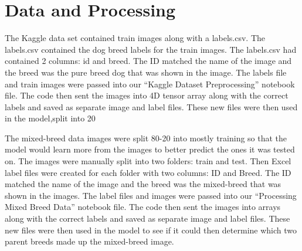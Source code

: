 \documentclass[12pt]{report}
\begin{document}
\section* {Data and Processing} 
		
\indent	\par  
\par The Kaggle data set contained train images along with a labels.csv. The labels.csv contained the dog breed labels for the train images. The labels.csv had contained 2 columns: id and breed. The ID matched the name of the image and the breed was the pure breed dog that was shown in the image. The labels file and train images were passed into our “Kaggle Dataset Preprocessing” notebook file. The code then sent the images into 4D tensor array along with the correct labels and saved as separate image and label files. These new files were then used in the model,split into 20%
\par The mixed-breed data images were split 80-20 into mostly training so that the model would learn more from the images to better predict the ones it was tested on. The images were manually split into two folders: train and test. Then Excel label files were created for each folder with two columns: ID and Breed. The ID matched the name of the image and the breed was the mixed-breed that was shown in the images. The label files and images were passed into our “Processing Mixed Breed Data” notebook file. The code then sent the images into arrays along with the correct labels and saved as separate image and label files. These new files were then used in the model to see if it could then determine which two parent breeds made up the mixed-breed image. 
\end{document}
